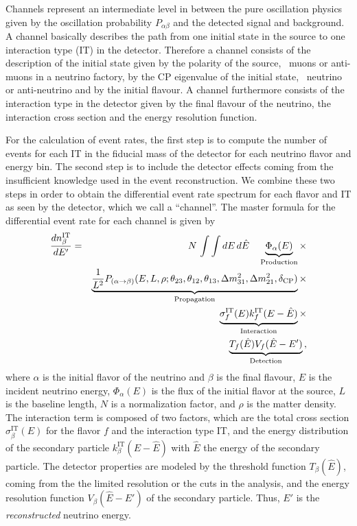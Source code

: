 Channels represent an intermediate level in between 
the pure oscillation 
physics given by the oscillation probability $P_{\alpha\beta}$ and the
detected signal and background. A channel basically describes the path from one
initial state in the source to one interaction type (IT) in  the detector.  
Therefore a channel consists of the description of the initial state given 
by the polarity 
of the source, \eg\ muons or anti-muons in a neutrino factory, by the CP 
eigenvalue of the initial state, \ie\ neutrino or anti-neutrino and by the 
initial flavour. A channel furthermore consists of the interaction type in the
detector given by the final flavour of the neutrino, the interaction cross
section and the energy resolution function. 
 
For the calculation of event rates, the first step is to compute the number of
events for each IT in the fiducial mass of the detector for each 
neutrino flavor and energy bin. The second step is to include the detector 
effects coming from
the insufficient knowledge used in the event reconstruction. We combine these
two steps in order to obtain the differential event rate spectrum for each
flavor and IT as seen by the detector, which we call a ``channel''. 
The master formula for the differential event rate for each channel 
is given by
\begin{eqnarray}
\label{eq:master_event}
\frac{dn_{\beta}^{\text{IT}}}{dE'}=&&N\,\int \int dE\,d\hat{E}\quad
\underbrace{\Phi_{\alpha} (E)}_{\mathrm{Production}} \times \nonumber\\
&&\underbrace{\frac{1}{L^2} P_{(\alpha\rightarrow\beta)}(E,L,\rho;\theta_{23},
\theta_{12},\theta_{13},
\Delta m^2_{31},\Delta m^2_{21},\delta_{\mathrm{CP}})}_{\mathrm{Propagation}}
\times \nonumber \\ &&\underbrace{\sigma^{\text{IT}}_f(E)
k_f^{\text{IT}}(E-\hat{E})}_{\mathrm{Interaction}} \times \nonumber \\
&&\underbrace{ T_f(\hat{E}) V_f(\hat{E}-E')}_{\mathrm{Detection}}\,,
\end{eqnarray}
where $\alpha$ is the initial flavor of the neutrino and 
$\beta$ is the final flavour, 
$E$ is the incident neutrino energy, $\Phi_{\alpha} (E)$ is the flux of the 
initial flavor at the
source, $L$ is the baseline length, $N$ is a normalization factor, and 
$\rho$ is the matter density. The interaction term is composed of 
two factors, which are the total cross section 
$\sigma^{\text{IT}}_\beta(E)$ for the flavor $f$ and
the interaction type IT, and the energy distribution of the 
secondary particle $k_\beta^{\text{IT}}(E-\hat{E})$ with 
$\hat{E}$ the energy of the secondary particle. The detector properties are 
modeled by the threshold function $T_\beta(\hat{E})$, coming from the the 
limited resolution or the cuts in the analysis, and the energy resolution 
function $V_\beta(\hat{E}-E')$ of the secondary particle. Thus, $E'$ is the 
{\em reconstructed} neutrino energy.

